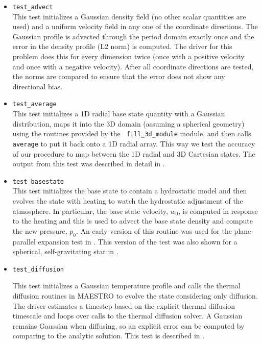 \begin{itemize}
\item {\tt test\_advect} \\[-3mm]

  This test initializes a Gaussian density field (no other scalar
  quantities are used) and a uniform velocity field in any one of the
  coordinate directions.  The Gaussian profile is advected through
  the period domain exactly once and the error in the density profile
  (L2 norm) is computed.  The driver for this problem does this 
  for every dimension twice (once with a positive velocity and once
  with a negative velocity).  After all coordinate directions are 
  tested, the norms are compared to ensure that the error does
  not show any directional bias.


\item {\tt test\_average} \\[-3mm]

  This test initializes a 1D radial base state quantity with a
  Gaussian distribution, maps it into the 3D domain (assuming a
  spherical geometry) using the routines provided by the {\tt
    fill\_3d\_module} module, and then calls {\tt average} to put it
  back onto a 1D radial array.  This way we test the accuracy of our
  procedure to map between the 1D radial and 3D Cartesian states.
  The output from this test was described in detail in
  \cite{multilevel}.

\item {\tt test\_basestate} \\[-3mm]

  This test initializes the base state to contain a hydrostatic
  model and then evolves the state with heating to watch the 
  hydrostatic adjustment of the atmosphere.  In particular,
  the base state velocity, $w_0$, is computed in response to 
  the heating and this is used to advect the base state density
  and compute the new pressure, $p_0$.  An early version of 
  this routine was used for the plane-parallel expansion test
  in \cite{lowMach2}.  This version of the test was also shown
  for a spherical, self-gravitating star in \cite{multilevel}.

  
\item {\tt test\_diffusion}

  This test initializes a Gaussian temperature profile and calls
  the thermal diffusion routines in MAESTRO to evolve the state 
  considering only diffusion.  The driver estimates a timestep
  based on the explicit thermal diffusion timescale and loops
  over calls to the thermal diffusion solver.  A Gaussian remains
  Gaussian when diffusing, so an explicit error can be computed
  by comparing to the analytic solution.  This test is 
  described in \cite{xrb}.



\end{itemize}
